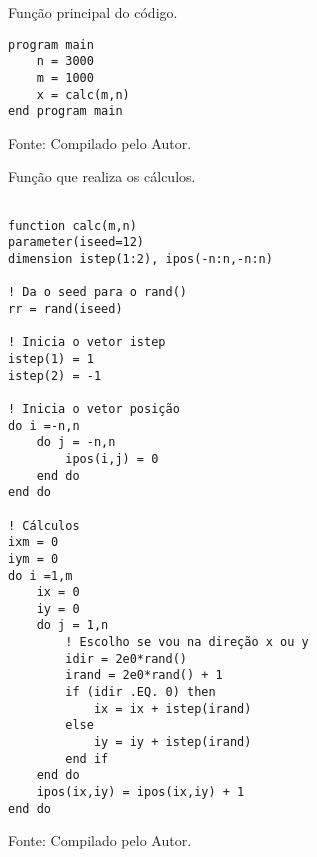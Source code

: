 \vspace*{1\baselineskip}

\begin{figure}[h!]
\centering
\caption{Função principal do código.}
\centering
\begin{lstlisting}
program main
    n = 3000
    m = 1000
    x = calc(m,n)
end program main
\end{lstlisting}
\caption*{Fonte: Compilado pelo Autor.}
\label{fig:tarefa 3 - função principal do código}
\end{figure}

\newpage

\begin{figure}[h!]
\centering
\caption{Função que realiza os cálculos.}
\centering
\begin{lstlisting}

function calc(m,n)
parameter(iseed=12)
dimension istep(1:2), ipos(-n:n,-n:n)

! Da o seed para o rand()
rr = rand(iseed)

! Inicia o vetor istep
istep(1) = 1
istep(2) = -1

! Inicia o vetor posição
do i =-n,n
    do j = -n,n
        ipos(i,j) = 0
    end do
end do

! Cálculos
ixm = 0
iym = 0
do i =1,m
    ix = 0
    iy = 0
    do j = 1,n
        ! Escolho se vou na direção x ou y
        idir = 2e0*rand()
        irand = 2e0*rand() + 1
        if (idir .EQ. 0) then
            ix = ix + istep(irand)
        else
            iy = iy + istep(irand)
        end if
    end do
    ipos(ix,iy) = ipos(ix,iy) + 1
end do

\end{lstlisting}
\caption*{Fonte: Compilado pelo Autor.}
\label{fig:tarefa 3 - função principal do código}
\end{figure}

\newpage

